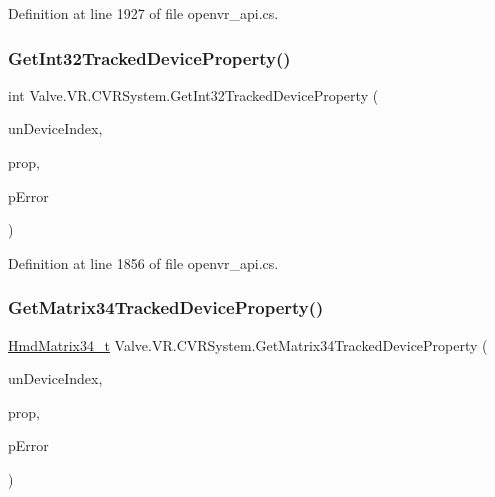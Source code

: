 Definition at line 1927 of file openvr\+\_\+api.\+cs.

\mbox{\label{class_valve_1_1_v_r_1_1_c_v_r_system_abe82e7c658121c24812c9cfc444a750c}} 
\subsubsection{\texorpdfstring{GetInt32TrackedDeviceProperty()}{GetInt32TrackedDeviceProperty()}}
{\footnotesize\ttfamily int Valve.\+V\+R.\+C\+V\+R\+System.\+Get\+Int32\+Tracked\+Device\+Property (\begin{DoxyParamCaption}\item[{uint}]{un\+Device\+Index,  }\item[{\mbox{\hyperlink{namespace_valve_1_1_v_r_ab060521ead7273986988fc4897e52482}{E\+Tracked\+Device\+Property}}}]{prop,  }\item[{ref \mbox{\hyperlink{namespace_valve_1_1_v_r_aab6684f03930a2d2cf22ed66b437e47b}{E\+Tracked\+Property\+Error}}}]{p\+Error }\end{DoxyParamCaption})}



Definition at line 1856 of file openvr\+\_\+api.\+cs.

\mbox{\label{class_valve_1_1_v_r_1_1_c_v_r_system_af01c2051f20b88132e757879a4869e80}} 
\subsubsection{\texorpdfstring{GetMatrix34TrackedDeviceProperty()}{GetMatrix34TrackedDeviceProperty()}}
{\footnotesize\ttfamily \mbox{\hyperlink{struct_valve_1_1_v_r_1_1_hmd_matrix34__t}{Hmd\+Matrix34\+\_\+t}} Valve.\+V\+R.\+C\+V\+R\+System.\+Get\+Matrix34\+Tracked\+Device\+Property (\begin{DoxyParamCaption}\item[{uint}]{un\+Device\+Index,  }\item[{\mbox{\hyperlink{namespace_valve_1_1_v_r_ab060521ead7273986988fc4897e52482}{E\+Tracked\+Device\+Property}}}]{prop,  }\item[{ref \mbox{\hyperlink{namespace_valve_1_1_v_r_aab6684f03930a2d2cf22ed66b437e47b}{E\+Tracked\+Property\+Error}}}]{p\+Error }\end{DoxyParamCaption})}



